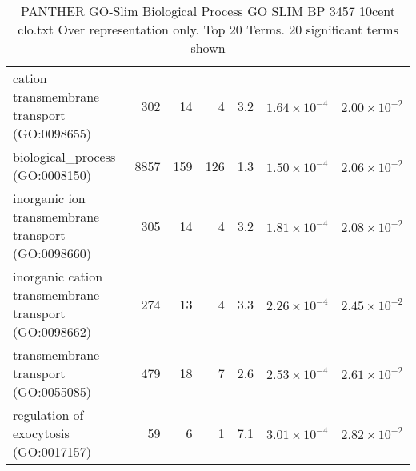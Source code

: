 \begin{table}[ht]
\begin{adjustbox}{width=\textwidth}
\begin{tabular}{lrrrrrr}
  cation transmembrane transport (GO:0098655) & 302 & 14 & 4 & 3.2 & $1.64 \times 10^{-4}$ & $2.00 \times 10^{-2}$ \\ 
  biological\_process (GO:0008150) & 8857 & 159 & 126 & 1.3 & $1.50 \times 10^{-4}$ & $2.06 \times 10^{-2}$ \\ 
  inorganic ion transmembrane transport (GO:0098660) & 305 & 14 & 4 & 3.2 & $1.81 \times 10^{-4}$ & $2.08 \times 10^{-2}$ \\ 
  inorganic cation transmembrane transport (GO:0098662) & 274 & 13 & 4 & 3.3 & $2.26 \times 10^{-4}$ & $2.45 \times 10^{-2}$ \\ 
  transmembrane transport (GO:0055085) & 479 & 18 & 7 & 2.6 & $2.53 \times 10^{-4}$ & $2.61 \times 10^{-2}$ \\ 
  regulation of exocytosis (GO:0017157) & 59 & 6 & 1 & 7.1 & $3.01 \times 10^{-4}$ & $2.82 \times 10^{-2}$ \\ 
   \hline
\end{tabular}
\end{adjustbox}
\caption{PANTHER GO-Slim Biological Process GO SLIM BP 3457 10cent clo.txt Over representation only. Top 20 Terms. 20 significant terms shown} 
\label{tab:PANTHER GO-Slim Biological Process GO SLIM BP 3457 10cent clo.txt Over representation only. Top 20 Terms. 20 significant terms shown}
\end{table}


